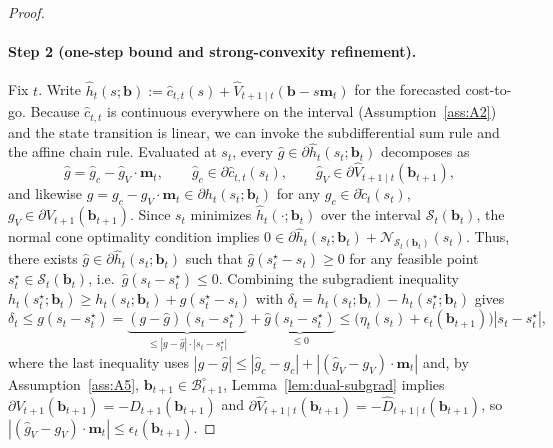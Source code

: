 \documentclass[11pt]{article}
\newcommand{\1}{\mathbf{1}}
\newcommand{\scalt}{\mathcal{S}_{t}}
\newcommand{\bcal}{\mathcal{B}}
\newcommand{\subdiff}{\partial}
\begin{document}
\begin{proof}
  \paragraph{Step 2 (one-step bound and strong-convexity refinement).}
  Fix $t$.
  Write $\hat{h}_t(s;\mathbf{b}) := \hat{c}_{t,t}(s) + \hat{V}_{t+1 \mid t}(\mathbf{b} - s \mathbf{m}_t)$ for the forecasted cost-to-go.
  Because $\hat{c}_{t,t}$ is continuous everywhere on the interval (Assumption~\ref{ass:A2}) and the state transition is linear, we can invoke the subdifferential sum rule and the affine chain rule. Evaluated at $s_t$, every $\hat{g} \in \subdiff \hat{h}_t(s_t;\mathbf{b}_t)$ decomposes as
  \begin{equation*}
    \hat{g} = \hat{g}_c - \hat{g}_V \cdot \mathbf{m}_t,
    \qquad
    \hat{g}_c \in \subdiff \hat{c}_{t,t}(s_t),
    \qquad
    \hat{g}_V \in \subdiff \hat{V}_{t+1 \mid t}(\mathbf{b}_{t+1}),
  \end{equation*}
  and likewise $g = g_c - g_V \cdot \mathbf{m}_t \in \subdiff h_t(s_t;\mathbf{b}_t)$ for any $g_c \in \subdiff \tilde{c}_t(s_t)$, $g_V \in \subdiff V_{t+1}(\mathbf{b}_{t+1})$.
  Since $s_t$ minimizes $\hat{h}_t(\cdot;\mathbf{b}_t)$ over the interval $\scalt(\mathbf{b}_t)$, the normal cone optimality condition implies $0 \in \subdiff \hat{h}_t(s_t;\mathbf{b}_t) + \mathcal{N}_{\scalt(\mathbf{b}_t)}(s_t)$.
  Thus, there exists $\hat{g} \in \subdiff \hat{h}_t(s_t;\mathbf{b}_t)$ such that $\hat{g}(s_t^{\star}-s_t) \geq 0$ for any feasible point $s_t^{\star} \in \scalt(\mathbf{b}_t)$, i.e.\ $\hat{g}(s_t - s_t^{\star}) \leq 0$.
  Combining the subgradient inequality $h_t(s_t^{\star};\mathbf{b}_t) \geq h_t(s_t;\mathbf{b}_t) + g(s_t^{\star}-s_t)$ with $\delta_t = h_t(s_t;\mathbf{b}_t) - h_t(s_t^{\star};\mathbf{b}_t)$ gives
  \begin{equation}
    \label{eq:one-step-chain}
    \delta_t
    \leq g(s_t - s_t^{\star})
    = \underbrace{(g - \hat{g})(s_t - s_t^{\star})}_{\leq |g-\hat{g}| \cdot |s_t - s_t^{\star}|}
    + \underbrace{\hat{g}(s_t - s_t^{\star})}_{\leq 0}
    \leq \bigl(\eta_t(s_t) + \epsilon_t(\mathbf{b}_{t+1})\bigr)|s_t - s_t^{\star}|,
  \end{equation}
  where the last inequality uses $|g-\hat{g}| \leq |\hat{g}_c-g_c| + |(\hat{g}_V-g_V)\cdot\mathbf{m}_t|$ and, by Assumption~\ref{ass:A5}, $\mathbf{b}_{t+1} \in \bcal_{t+1}^\circ$, Lemma~\ref{lem:dual-subgrad} implies $\subdiff V_{t+1}(\mathbf{b}_{t+1})=-D_{t+1}(\mathbf{b}_{t+1})$ and $\subdiff \hat{V}_{t+1 \mid t}(\mathbf{b}_{t+1})=-\hat{D}_{t+1 \mid t}(\mathbf{b}_{t+1})$, so $|(\hat{g}_V-g_V)\cdot\mathbf{m}_t| \leq \epsilon_t(\mathbf{b}_{t+1})$.


\end{proof}
\end{document}
